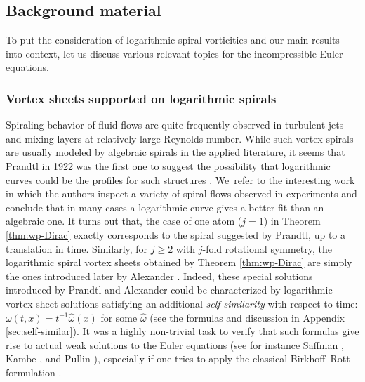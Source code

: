 \documentclass[10pt]{amsart}
\theoremstyle{plain}
\theoremstyle{definition}
\let\omg\omega
\begin{document}
\subsection{Background material}

To put the consideration of logarithmic spiral vorticities and our main results into context, let us discuss various relevant topics for the incompressible Euler equations.

\subsubsection*{Vortex sheets supported on logarithmic spirals}
Spiraling behavior of fluid flows are quite frequently observed in turbulent jets and mixing layers at relatively large Reynolds number. While such vortex spirals are usually modeled by algebraic spirals in the applied literature, it seems that Prandtl in 1922 was the first one to suggest the possibility that logarithmic curves could be the profiles for such structures \cite{Prandtl61}. We~refer to the interesting work \cite{Spiral} in which the authors inspect a variety of spiral flows observed in experiments and conclude that in many cases a logarithmic curve gives a better fit than an algebraic one. It turns out that, the case of one atom ($j=1$) in Theorem \ref{thm:wp-Dirac} exactly corresponds to the spiral suggested by Prandtl, up to a translation in time. Similarly, for $j\ge2$ with $j$-fold rotational symmetry, the logarithmic spiral vortex sheets obtained by Theorem \ref{thm:wp-Dirac} are simply the ones introduced later by Alexander \cite{Alexander71}. Indeed, these special solutions introduced by Prandtl and Alexander could be characterized by logarithmic vortex sheet solutions satisfying an additional \textit{self-similarity} with respect to time: $\omg(t,x)=t^{-1}\hat{\omg}(x)$ for some $\hat{\omg}$ (see the formulas and discussion in Appendix \ref{sec:self-similar}). It was a highly non-trivial task to verify that such formulas give rise to actual weak solutions to the Euler equations (see for instance Saffman \cite[\S 8.3]{Saff}, Kambe \cite{Kam}, and Pullin \cite{Pull}), especially if one tries to apply the classical Birkhoff--Rott formulation \cite{Birkhoff,Rott}.
\end{document}
